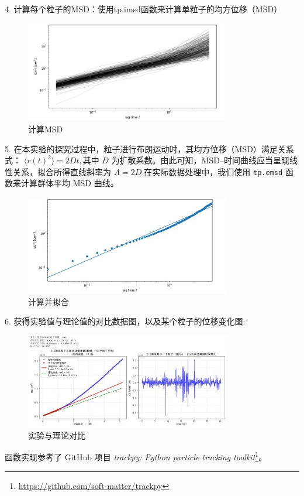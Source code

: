 \documentclass[a4paper]{report} %
\begin{document}
4. 计算每个粒子的MSD：使用tp.imsd函数来计算单粒子的均方位移（MSD）
\begin{figure}[H]
    \centering
    \includegraphics[width=0.8\textwidth]{计算MSD.jpg}
    \caption{计算MSD}
\end{figure} 
5. 在本实验的探究过程中，粒子进行布朗运动时，其均方位移（MSD）满足关系式：
$\langle r(t)^2 \rangle = 2Dt,$其中 $D$ 为扩散系数。由此可知，MSD--时间曲线应当呈现线性关系，拟合所得直线斜率为
$A = 2D.$在实际数据处理中，我们使用 \texttt{tp.emsd} 函数来计算群体平均 MSD 曲线。
\begin{figure}[H]
    \centering
    \includegraphics[width=0.8\textwidth]{计算并拟合.jpg}
    \caption{计算并拟合}
\end{figure} 
6. 获得实验值与理论值的对比数据图，以及某个粒子的位移变化图:
\begin{figure}[H]
    \centering
    \includegraphics[width=0.8\textwidth]{实际示例.jpg}
    \caption{实验与理论对比}
\end{figure} 
函数实现参考了 GitHub 项目 \emph{trackpy: Python particle tracking toolkit}\footnote{\url{https://github.com/soft-matter/trackpy}}。
\end{document}
